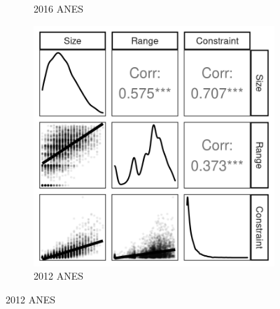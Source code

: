 \begin{figure}[h]
\begin{subfigure}[h]{0.27\textwidth}
        \caption{2016 ANES}
    \end{subfigure}%
    \begin{subfigure}[h]{0.27\textwidth}
         \centering
         \includegraphics[width=\textwidth]{../fig/anes2012_components.png}
         \caption{2012 ANES}
    \end{subfigure}%


\end{figure}

